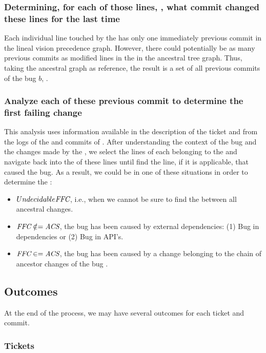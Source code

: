 \documentclass[a4paper, 12pt]{book}
\begin{document}
\subsubsection{Determining, for each of those lines, , what commit changed these lines for the last time}

Each individual line touched by the \BFC has only one immediately previous commit in the lineal vision precedence graph. However, there could potentially be as many previous commits as modified lines in the \BFC in the ancestral tree graph. Thus, taking the ancestral graph as reference,  the result is a set of all previous commits of the bug $b$, .

\subsubsection{Analyze each of these previous commit to determine the first failing change}

This analysis uses information available in the description of the ticket and from the logs of the \BFC and commits of . After understanding the context of the bug and the changes made by the \BFC, we select the lines of each \pc belonging to the  and navigate back into the \ACS of these lines until find the line, if it is applicable, that caused the bug. As a result, we could be in one of these situations in order to determine the \FFC:
\begin{itemize}
	\item $ Undecidable \emph{FFC} $, i.e.,  when we cannot be sure to find the \FFC between all ancestral changes.
	\item $ \emph{FFC} \notin= \emph{ACS}$, the bug has been caused by external dependencies: (1) Bug in dependencies or (2) Bug in API's.
	\item $ \emph{FFC} \in = \emph{ACS}$, the bug has been caused by a change belonging to the chain of ancestor changes of the bug .
\end{itemize}

\subsection{Outcomes}

At the end of the process, we may have several outcomes for each ticket and commit.
\subsubsection{Tickets}
\end{document}
